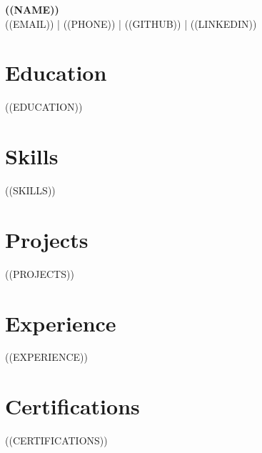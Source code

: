 \documentclass[10pt,a4paper]{article}
\begin{document}
{\LARGE \textbf{((NAME))}}\\[2pt]
((EMAIL)) \;|\; ((PHONE)) \;|\; ((GITHUB)) \;|\; ((LINKEDIN))

\section*{Education}
((EDUCATION))

\section*{Skills}
((SKILLS))

\section*{Projects}
((PROJECTS))

\section*{Experience}
((EXPERIENCE))

\section*{Certifications}
((CERTIFICATIONS))
\end{document}
